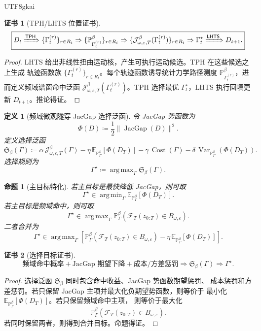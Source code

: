 \documentclass[12pt]{article}
\newtheorem{definition}{定义}[section]
\newtheorem{proposition}{命题}[section]
\newtheorem{Certificate}{证书}[section]
\newcommand{\LHTS}{\ensuremath{\mathsf{LHTS}}}
\newcommand{\TPH}{\ensuremath{\mathsf{TPH}}}
\newcommand{\DefEq}{\coloneqq}
\newcommand{\Prob}{\mathbb P}
\newcommand{\E}{\mathbb E}
\DeclareMathOperator{\Cost}{Cost}
\DeclareMathOperator{\JacGap}{JacGap}
\DeclareMathOperator{\Var}{Var}
\DeclareMathOperator*{\argmax}{arg\,max}
\DeclareMathOperator*{\argmin}{arg\,min}
\begin{document}
\begin{CJK*}{UTF8}{gkai}
\begin{Certificate}[TPH/LHTS 位置证书]
\[
\boxed{
D_t
\xRightarrow{\TPH}
\{\Gamma_t^{(r)}\}_{r\in R_t}
\Rightarrow
\{\Prob_{\Gamma_t^{(r)}}^\beta\}_{r\in R_t}
\Rightarrow
\{\mathcal J_{\omega,\varepsilon,T}^{\beta}(\Gamma_t^{(r)})\}_{r\in R_t}
\Rightarrow
\Gamma_t^\star
\xRightarrow{\LHTS}
D_{t+1}.
}
\]
\end{Certificate}

\begin{proof}
LHTS 给出非线性扭曲运动核，产生可执行运动候选。TPH 在这些候选之上生成
轨迹函数族 \(\{\Gamma_t^{(r)}\}_{r\in R_t}\)。每个轨迹函数诱导统计力学路径测度
\(\Prob_{\Gamma_t^{(r)}}^\beta\)，进而定义频域谱窗命中泛函
\(\mathcal J_{\omega,\varepsilon,T}^{\beta}(\Gamma_t^{(r)})\)。TPH 选择最优
\(\Gamma_t^\star\)，LHTS 执行回填更新 \(D_{t+1}\)。推论得证。
\end{proof}

\begin{definition}[频域微观隧穿 JacGap 选择泛函]
令 JacGap 势函数为
\[
\Phi(D)
\DefEq
\frac12\|\JacGap(D)\|^2.
\]
定义选择泛函
\[
\boxed{
\mathfrak S_\beta(\Gamma)
\DefEq
\alpha\,\mathcal J_{\omega,\varepsilon,T}^{\beta}(\Gamma)
-
\eta\,\E_{\Prob_\Gamma^\beta}[\Phi(D_T)]
-
\gamma\,\Cost(\Gamma)
-
\delta\,\Var_{\Prob_\Gamma^\beta}(\Phi(D_T)).
}
\]
选择规则为
\[
\boxed{
\Gamma^\star
\DefEq
\argmax_{\Gamma}
\mathfrak S_\beta(\Gamma).
}
\]
\end{definition}

\begin{proposition}[主目标特化]
若主目标是最快降低 JacGap，则可取
\[
\boxed{
\Gamma^\star
\in
\argmin_{\Gamma}
\E_{\Prob_\Gamma^\beta}[\Phi(D_T)].
}
\]
若主目标是频域命中，则可取
\[
\boxed{
\Gamma^\star
\in
\argmax_{\Gamma}
\Prob_\Gamma^\beta
\left(
\mathscr F_T(z_{0:T})\in B_{\omega,\varepsilon}
\right).
}
\]
二者合并为
\[
\boxed{
\Gamma^\star
\in
\argmax_{\Gamma}
\left[
\Prob_\Gamma^\beta
\left(
\mathscr F_T(z_{0:T})\in B_{\omega,\varepsilon}
\right)
-
\eta\,\E_{\Prob_\Gamma^\beta}[\Phi(D_T)]
\right].
}
\]
\end{proposition}

\begin{Certificate}[选择目标证书]
\[
\boxed{
\text{频域命中概率}
+
\text{JacGap 期望下降}
+
\text{成本/方差惩罚}
\Rightarrow
\mathfrak S_\beta(\Gamma)
\Rightarrow
\Gamma^\star.
}
\]
\end{Certificate}

\begin{proof}
选择泛函 \(\mathfrak S_\beta\) 同时包含命中收益、JacGap 势函数期望惩罚、
成本惩罚和方差惩罚。若只保留 JacGap 主项并最大化负期望势函数，则等价于
最小化 \(\E_{\Prob_\Gamma^\beta}[\Phi(D_T)]\)。若只保留频域命中主项，
则等价于最大化
\[
\Prob_\Gamma^\beta(\mathscr F_T(z_{0:T})\in B_{\omega,\varepsilon}).
\]
若同时保留两者，则得到合并目标。命题得证。
\end{proof}


\end{CJK*}
\end{document}
